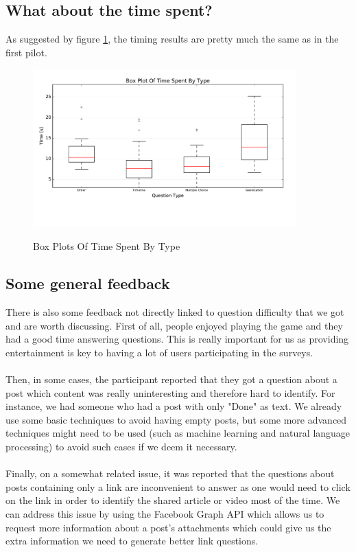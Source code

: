 \subsection{What about the time spent?}
As suggested by figure \ref{fig:p2BoxesTime}, the timing results are pretty much the same as in the first pilot.
\begin{figure}
\centering
{\includegraphics[width=4in]{images/pilot_2_boxplot_time.pdf}}
\caption{Box Plots Of Time Spent By Type}
\label{fig:p2BoxesTime}
\end{figure}

\subsection{Some general feedback}
There is also some feedback not directly linked to question difficulty that we got and are worth discussing. First of all, people enjoyed playing the game and they had a good time answering questions. This is really important for us as providing entertainment is key to having a lot of users participating in the surveys.\\\\
Then, in some cases, the participant reported that they got a question about a post which content was really uninteresting and therefore hard to identify. For instance, we had someone who had a post with only "Done" as text. We already use some basic techniques to avoid having empty posts, but some more advanced techniques might need to be used (such as machine learning and natural language processing\cite{nlp}) to avoid such cases if we deem it necessary.\\\\
Finally, on a somewhat related issue, it was reported that the questions about posts containing only a link are inconvenient to answer as one would need to click on the link in order to identify the shared article or video most of the time. We can address this issue by using the Facebook Graph API which allows us to request more information about a post's attachments which could give us the extra information we need to generate better link questions.